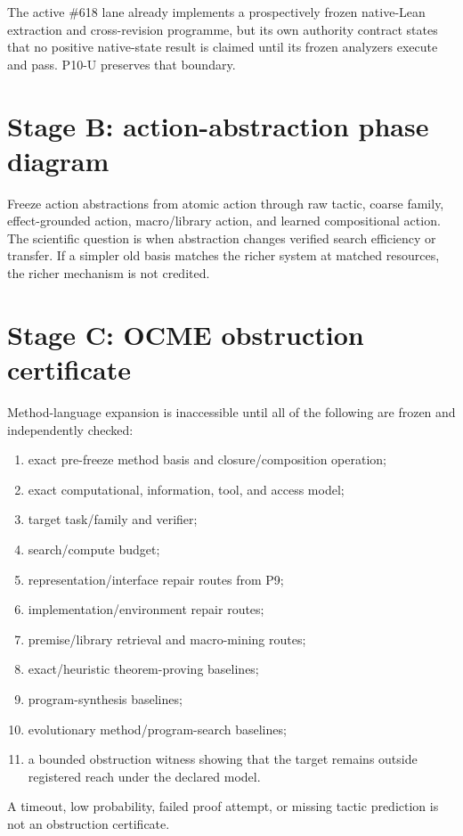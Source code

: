 \documentclass[11pt]{article}
\begin{document}
The active \#618 lane already implements a prospectively frozen native-Lean extraction and cross-revision programme, but its own authority contract states that no positive native-state result is claimed until its frozen analyzers execute and pass. P10-U preserves that boundary.

\section{Stage B: action-abstraction phase diagram}
Freeze action abstractions from atomic action through raw tactic, coarse family, effect-grounded action, macro/library action, and learned compositional action. The scientific question is when abstraction changes verified search efficiency or transfer. If a simpler old basis matches the richer system at matched resources, the richer mechanism is not credited.

\section{Stage C: OCME obstruction certificate}
Method-language expansion is inaccessible until all of the following are frozen and independently checked:
\begin{enumerate}
    \item exact pre-freeze method basis and closure/composition operation;
    \item exact computational, information, tool, and access model;
    \item target task/family and verifier;
    \item search/compute budget;
    \item representation/interface repair routes from P9;
    \item implementation/environment repair routes;
    \item premise/library retrieval and macro-mining routes;
    \item exact/heuristic theorem-proving baselines;
    \item program-synthesis baselines;
    \item evolutionary method/program-search baselines;
    \item a bounded obstruction witness showing that the target remains outside registered reach under the declared model.
\end{enumerate}
A timeout, low probability, failed proof attempt, or missing tactic prediction is not an obstruction certificate.
\end{document}
